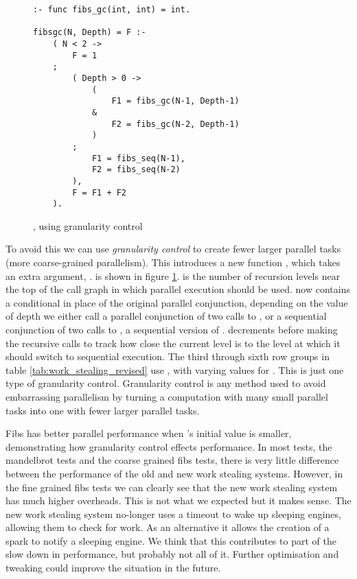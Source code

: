 \begin{figure}
\begin{verbatim}
:- func fibs_gc(int, int) = int.

fibsgc(N, Depth) = F :-
    ( N < 2 ->
        F = 1
    ;
        ( Depth > 0 ->
            (
                F1 = fibs_gc(N-1, Depth-1)
            &
                F2 = fibs_gc(N-2, Depth-1)
            )
        ;
            F1 = fibs_seq(N-1),
            F2 = fibs_seq(N-2)
        ),
        F = F1 + F2
    ).
\end{verbatim}
\caption{\fibsgc, \fibs using granularity control}
\label{fig:fibsgc}
\end{figure}

To avoid this we can use \emph{granularity control} to create fewer larger
parallel tasks (more coarse-grained parallelism).
This introduces a new function \fibsgc, which takes an extra argument,
\Depth.
\fibsgc is shown in figure \ref{fig:fibsgc}.
\Depth is the number of recursion levels near the top of the call graph in
which parallel execution should be used.
\fibsgc now contains a conditional in place of the original parallel
conjunction,
depending on the value of depth we either call a parallel conjunction of two
calls to \fibsgc,
or a sequential conjunction of two calls to \fibsseq, a sequential version of
\fibs.
\fibsgc decrements \Depth before making the recursive calls to track how
close the current level is to the level at which it should switch to
sequential execution.
The third through sixth row groups in table
\ref{tab:work_stealing_revised} use \fibsgc, with varying values for
\Depth.
This is just one type of granularity control.
Granularity control is any method used to avoid
embarrassing parallelism by turning a computation with 
many small parallel tasks into one with fewer larger parallel tasks.

Fibs has better parallel performance when \Depth's initial value is
smaller,
demonstrating how granularity control effects performance.
In most tests,
the mandelbrot tests and the coarse grained fibs tests,
there is very little difference between the performance of the old and new
work stealing systems.
However,
in the fine grained fibs tests we can clearly see that the new work stealing
system has much higher overheads.
This is not what we expected but it makes sense.
The new work stealing system no-longer uses a timeout to wake up sleeping
engines, allowing them to check for work.
As an alternative it allows the creation of a spark to notify a sleeping
engine.
We think that this contributes to part of the slow down in performance,
but probably not all of it.
Further optimisation and tweaking could improve the situation in the future.

